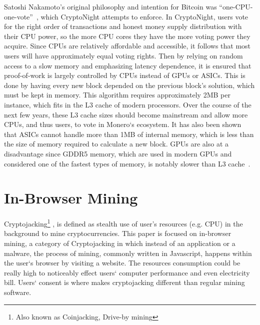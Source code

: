 Satoshi Nakamoto’s original philosophy and intention for Bitcoin was “one-CPU-one-vote”~\cite{nakamoto2008bitcoin}, which CryptoNight attempts to enforce. In CryptoNight, users vote for the right order of transactions and honest money supply distribution with their CPU power, so the more CPU cores they have the more voting power they acquire. Since CPUs are relatively affordable and accessible, it follows that most users will have approximately equal voting rights. Then by relying on random access to a slow memory and emphasizing latency dependence, it is ensured that proof-of-work is largely controlled by CPUs instead of GPUs or ASICs. This is done by having every new block depended on the previous block’s solution, which must be kept in memory. This algorithm requires approximately 2MB per instance, which fits in the L3 cache of modern processors. Over the course of the next few years, these L3 cache sizes should become mainstream and allow more CPUs, and thus users, to vote in Monero`s ecosystem. It has also been shown that ASICs cannot handle more than 1MB of internal memory, which is less than the size of memory required to calculate a new block. GPUs are also at a disadvantage since GDDR5 memory, which are used in modern GPUs and considered one of the fastest types of memory, is notably slower than L3 cache~\cite{van2013cryptonote}.  

\section{In-Browser Mining}
Cryptojacking\footnote{Also known as Coinjacking, Drive-by mining} , is defined as stealth use of user's resources (e.g. CPU) in the background to mine cryptocurrencies. This paper is focused on in-browser mining, a category of Cryptojacking in which instead of an application or a malware, the process of mining, commonly written in Javascript, happens within the user`s browser by visiting a website. The resources consumption could be really high to noticeably effect users` computer performance and even electricity bill. Users` consent is where makes cryptojacking different than regular mining software.

